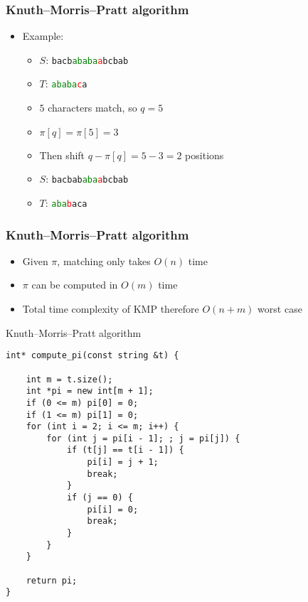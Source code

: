 \begin{frame}
    \frametitle{Knuth--Morris--Pratt algorithm}
    \begin{itemize}
        \item Example:
        \begin{itemize}
            \item $S$: \texttt{bacb\textcolor{green}{ababa}\textcolor{red}{a}bcbab}
            \item $T$: \texttt{\textcolor{green}{ababa}\textcolor{red}{c}a}
            \item<2-> $5$ characters match, so $q = 5$
            \item<3-> $\pi[q] = \pi[5] = 3$
            \item<4-> Then shift $q - \pi[q] = 5 - 3 = 2$ positions
            \item<5-> $S$: \texttt{bacbab\textcolor{green}{aba}\textcolor{red}{a}bcbab}
            \item<5-> $T$: \texttt{\textcolor{green}{aba}\textcolor{red}{b}aca}
        \end{itemize}
    \end{itemize}
\end{frame}

\begin{frame}
    \frametitle{Knuth--Morris--Pratt algorithm}
    \begin{itemize}
        \item Given $\pi$, matching only takes $O(n)$ time
        \item $\pi$ can be computed in $O(m)$ time
        \item Total time complexity of KMP therefore $O(n+m)$ worst case
    \end{itemize}
\end{frame}

\begin{frame}[fragile]{Knuth--Morris--Pratt algorithm}
    \begin{verbatim}
int* compute_pi(const string &t) {

    int m = t.size();
    int *pi = new int[m + 1];
    if (0 <= m) pi[0] = 0;
    if (1 <= m) pi[1] = 0;
    for (int i = 2; i <= m; i++) {
        for (int j = pi[i - 1]; ; j = pi[j]) {
            if (t[j] == t[i - 1]) {
                pi[i] = j + 1;
                break;
            }
            if (j == 0) {
                pi[i] = 0;
                break;
            }
        }
    }

    return pi;
}
    \end{verbatim}
\end{frame}

